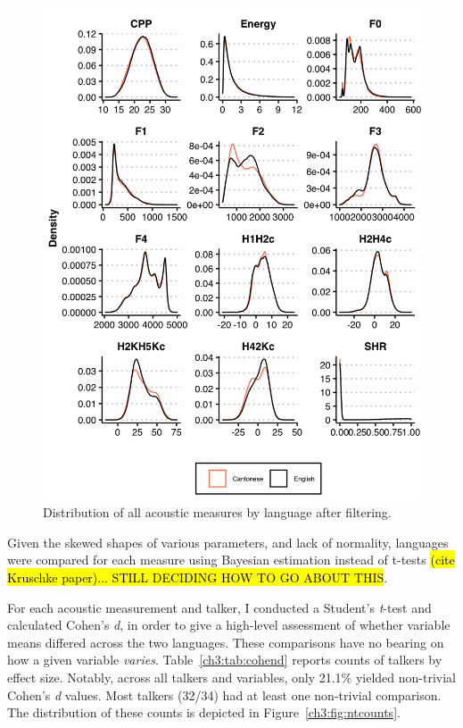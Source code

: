 \begin{figure}[htbp]
    \begin{center}
    \includegraphics[width=\linewidth]{figures/ch3_allmeasuresdensity_5in.png} 
    \caption{Distribution of all acoustic measures by language after filtering.}
    \label{ch3:fig:allmeasures}
    \end{center}
    \end{figure}


Given the skewed shapes of various parameters, and lack of normality, languages were compared for each measure using Bayesian estimation instead of t-tests \hl{(cite Kruschke paper)... STILL DECIDING HOW TO GO ABOUT THIS}. 

For each acoustic measurement and talker, I conducted a Student's \textit{t}-test and calculated Cohen's \textit{d}, in order to give a high-level assessment of whether variable means differed across the two languages. These comparisons have no bearing on how a given variable \textit{varies}. Table~\ref{ch3:tab:cohend} reports counts of talkers by effect size. Notably, across all talkers and variables, only 21.1\% yielded non-trivial Cohen's \textit{d} values. Most talkers (32/34) had at least one non-trivial comparison. The distribution of these counts is depicted in Figure~\ref{ch3:fig:ntcounts}. 

